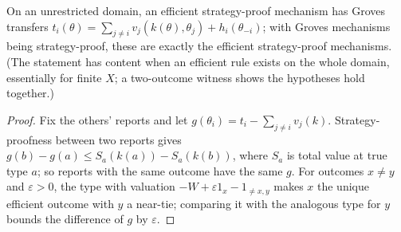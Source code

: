 \begin{theorem}
\label{thm:green-laffont}
\leanok
{}
On an unrestricted domain, an efficient strategy-proof mechanism has Groves transfers
$t_i(\theta) = \sum_{j \ne i} v_j(k(\theta), \theta_j) + h_i(\theta_{-i})$; with Groves mechanisms being strategy-proof,
these are exactly the efficient strategy-proof mechanisms. (The statement has content when an efficient rule exists on
the whole domain, essentially for finite $X$; a two-outcome witness shows the hypotheses hold together.)
\end{theorem}
\begin{proof}
\leanok
Fix the others' reports and let $g(\theta_i) = t_i - \sum_{j\ne i} v_j(k)$. Strategy-proofness between two reports gives
$g(b) - g(a) \le S_a(k(a)) - S_a(k(b))$, where $S_a$ is total value at true type $a$; so reports with the same outcome
have the same $g$. For outcomes $x \ne y$ and $\varepsilon > 0$, the type with valuation $-W + \varepsilon 1_x - 1_{\ne x,y}$
makes $x$ the unique efficient outcome with $y$ a near-tie; comparing it with the analogous type for $y$ bounds the
difference of $g$ by $\varepsilon$.
\end{proof}
